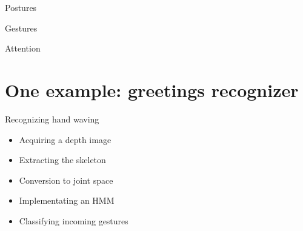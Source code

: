 \documentclass[compress]{beamer}
\begin{document}
\begin{frame}{Postures}
\end{frame}

\begin{frame}{Gestures}
\end{frame}

\begin{frame}{Attention}
\end{frame}



\section{One example: greetings recognizer}

\begin{frame}{Recognizing hand waving}
    \begin{itemize}
        \item Acquiring a depth image
        \item Extracting the skeleton
        \item Conversion to joint space
        \item Implementating an HMM
        \item Classifying incoming gestures
    \end{itemize}
\end{frame}
\end{document}
